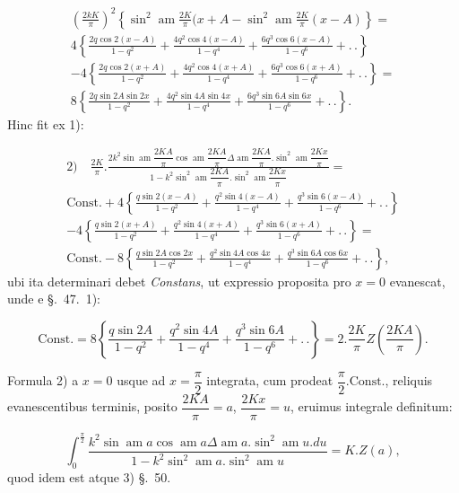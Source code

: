 \documentclass{article}
\begin{document}
\[
\begin{gathered}
\left(\frac{2kK}{\pi}\right)^{2}\left\{\sin^{2}\operatorname{am}\frac{2K}{\pi}(x+A-\sin^{2}\operatorname{am}\frac{2K}{\pi}(x-A)\right\}=\\[1.5ex]
4\left\{\frac{2q\cos2(x-A)}{1-q^{2}}+\frac{4q^{2}\cos4(x-A)}{1-q^{4}}+\frac{6q^{3}\cos6(x-A)}{1-q^{6}}+.\,.\right\}\\[1.5ex]
-4\left\{\frac{2q\cos2(x+A)}{1-q^{2}}+\frac{4q^{2}\cos4(x+A)}{1-q^{4}}+\frac{6q^{3}\cos6(x+A)}{1-q^{6}}+.\,.\right\}=\\[1.5ex]
8\left\{\frac{2q\sin2A\sin2x}{1-q^{2}}+\frac{4q^{2}\sin4A\sin4x}{1-q^{4}}+\frac{6q^{3}\sin6A\sin6x}{1-q^{6}}+.\,.\right\}.
\end{gathered}
\]
Hinc fit ex 1):

\[
\begin{gathered}
\text{2)}\quad\frac{2K}{\pi}.\frac{2k^{2}\sin\operatorname{am}\dfrac{2KA}{\pi}\cos\operatorname{am}\dfrac{2KA}{\pi}\Delta\operatorname{am}\dfrac{2KA}{\pi}.\sin^{2}\operatorname{am}\dfrac{2Kx}{\pi}}{1-k^{2}\sin^{2}\operatorname{am}\dfrac{2KA}{\pi}.\sin^{2}\operatorname{am}\dfrac{2Kx}{\pi}}=\\[1.5ex]
\text{Const.}+4\left\{\frac{q\sin2(x-A)}{1-q^{2}}+\frac{q^{2}\sin4(x-A)}{1-q^{4}}+\frac{q^{3}\sin6(x-A)}{1-q^{6}}+.\,.\right\}\\[1.5ex]
-4\left\{\frac{q\sin2(x+A)}{1-q^{2}}+\frac{q^{2}\sin4(x+A)}{1-q^{4}}+\frac{q^{3}\sin6(x+A)}{1-q^{6}}+.\,.\right\}=\\[1.5ex]
\text{Const.}-8\left\{\frac{q\sin2A\cos2x}{1-q^{2}}+\frac{q^{2}\sin4A\cos4x}{1-q^{4}}+\frac{q^{3}\sin6A\cos6x}{1-q^{6}}+.\,.\right\},
\end{gathered}
\]
ubi ita determinari debet \emph{Constans}, ut expressio proposita pro $x=0$ evanescat, unde e §.\ 47.\ 1):

\[
\text{Const.}=8\left\{\frac{q\sin2A}{1-q^{2}}+\frac{q^{2}\sin4A}{1-q^{4}}+\frac{q^{3}\sin6A}{1-q^{6}}+.\,.\right\}=2.\frac{2K}{\pi}Z\left(\frac{2KA}{\pi}\right).
\]

Formula 2) a $x=0$ usque ad $x=\dfrac{\pi}{2}$ integrata, cum prodeat $\dfrac{\pi}{2}.\text{Const.}$, reliquis evanescentibus terminis, posito $\dfrac{2KA}{\pi}=a$, $\dfrac{2Kx}{\pi}=u$, eruimus integrale definitum:

\[
\int_{0}^{\frac{\pi}{2}}\frac{k^{2}\sin\operatorname{am}a\cos\operatorname{am}a\Delta\operatorname{am}a.\sin^{2}\operatorname{am}u.du}{1-k^{2}\sin^{2}\operatorname{am}a.\sin^{2}\operatorname{am}u}=K.Z(a),
\]
quod idem est atque 3) §.\ 50.
\end{document}
